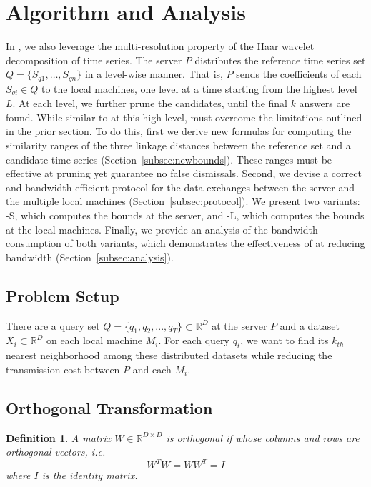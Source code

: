 \section{\MSWaveH{} Algorithm and Analysis}
\label{sec:framework}

In \MSWave{}, we also leverage the multi-resolution property of the
Haar wavelet decomposition of time series. The server $P$ distributes
the reference time series set $Q=\{S_{q1},\ldots,S_{qn}\}$ in a
level-wise manner. That is, $P$ sends the coefficients of each $S_{qi}
\in Q$ to the local machines, one level at a time starting from the
highest level $L$.  At each level, we further prune the candidates,
until the final $k$ answers are found.  While similar to \LeeWave{} at
this high level, \MSWave{} must overcome the limitations outlined in
the prior section.  To do this, first we derive new formulas for
computing the similarity ranges of the three linkage distances between
the reference set and a candidate time series
(Section~\ref{subsec:newbounds}).  These ranges must be effective at
pruning yet guarantee no false dismissals.  Second, we devise a
correct and bandwidth-efficient protocol for the data exchanges
between the server and the multiple local machines
(Section~\ref{subsec:protocol}).  We present two variants:
\MSWave-S{}, which computes the bounds at the server, and \MSWave-L{},
which computes the bounds at the local machines.  Finally, we provide
an analysis of the bandwidth consumption of both variants,
which demonstrates the effectiveness of \MSWave{} at reducing bandwidth
(Section~\ref{subsec:analysis}).

\subsection{Problem Setup}\label{subsec:probset}
There are a query set $Q={\{q_1,q_2,...,q_T\}}\subset\mathbb{R}^D$ at the server $P$ and a dataset $X_i\subset\mathbb{R}^D$ on each local machine $M_i$.  For each query $q_t$, we want to find its $k_{th}$ nearest neighborhood among these distributed datasets while reducing the transmission cost between $P$ and each $M_i$.

\subsection{Orthogonal Transformation}
\newtheorem{Orthogonal}{\bf Definition}
\begin{Orthogonal}
A matrix $W \in\mathbb{R}^{D\times D}$ is orthogonal if whose columns and rows are orthogonal vectors, i.e.
\[
W^{T}W=WW^{T}=I
\]
where $I$ is the identity matrix.
\end{Orthogonal}

